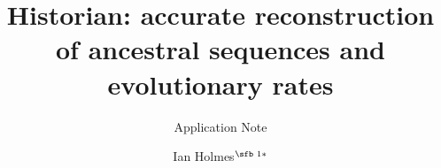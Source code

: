 \documentclass{bioinfo}
\begin{document}


\newcommand\structabs[5]{
\abstract{
{\bf Motivation.}
#1
{\bf Results.}
#2
{\bf Availability and Implementation.}
#3
{\bf Contact.}
#4
{\bf Supplementary Information.}
#5
}}

\subtitle{Application Note}
\title[Historian: accurate reconstruction of sequences and rates]{Historian: accurate reconstruction of ancestral sequences and evolutionary rates}
\author[Ian Holmes]{Ian Holmes$^{\text{\sfb 1}*}$}
\address{$^{\text{\sf 1}}$Department of Bioengineering, University of California, Berkeley, 94720, USA.}


\end{document}

